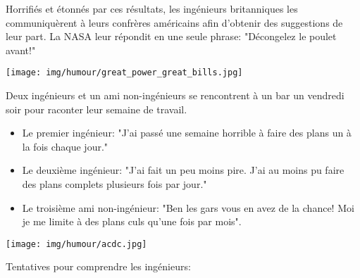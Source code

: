 	Horrifiés et étonnés par ces résultats, les ingénieurs britanniques les communiquèrent  à leurs confrères américains afin d'obtenir des suggestions de leur part. La NASA leur répondit en une seule phrase: "Décongelez le poulet avant!"

	\begin{center}\underline{\hspace{5 cm}}\end{center}
	
	\begin{center}
	\texttt{[image: img/humour/great\_power\_great\_bills.jpg]}
	\end{center}

	\begin{center}\underline{\hspace{5 cm}}\end{center}

Deux ingénieurs et un ami non-ingénieurs se rencontrent à un bar un vendredi soir pour raconter leur semaine de travail.

	\begin{itemize}
		\item Le premier ingénieur: "J'ai passé une semaine horrible à faire des plans un à la fois chaque jour."
	
		\item Le deuxième ingénieur: "J'ai fait un peu moins pire. J'ai au moins pu faire des plans complets plusieurs fois par jour."
	
		\item Le troisième ami non-ingénieur: "Ben les gars vous en avez de la chance! Moi je me limite à des plans culs qu'une fois par mois".
	\end{itemize}
	\begin{center}\underline{\hspace{5 cm}}\end{center}

	\begin{center}
	\texttt{[image: img/humour/acdc.jpg]}
	\end{center}

	\begin{center}\underline{\hspace{5 cm}}\end{center}

Tentatives pour comprendre les ingénieurs:

